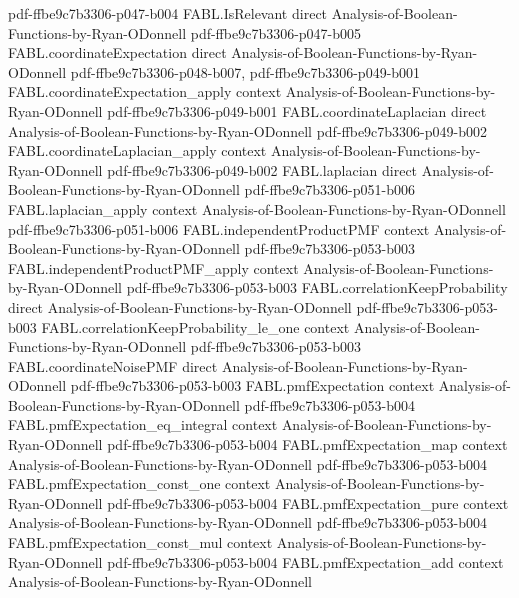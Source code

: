 \begin{theorem}
  {pdf-ffbe9c7b3306-p047-b004}
\proofstep
  {FABL.IsRelevant}
  {direct}
  {Analysis-of-Boolean-Functions-by-Ryan-ODonnell}
  {pdf-ffbe9c7b3306-p047-b005}
\proofstep
  {FABL.coordinateExpectation}
  {direct}
  {Analysis-of-Boolean-Functions-by-Ryan-ODonnell}
  {pdf-ffbe9c7b3306-p048-b007,
    pdf-ffbe9c7b3306-p049-b001}
\proofstep
  {FABL.coordinateExpectation_apply}
  {context}
  {Analysis-of-Boolean-Functions-by-Ryan-ODonnell}
  {pdf-ffbe9c7b3306-p049-b001}
\proofstep
  {FABL.coordinateLaplacian}
  {direct}
  {Analysis-of-Boolean-Functions-by-Ryan-ODonnell}
  {pdf-ffbe9c7b3306-p049-b002}
\proofstep
  {FABL.coordinateLaplacian_apply}
  {context}
  {Analysis-of-Boolean-Functions-by-Ryan-ODonnell}
  {pdf-ffbe9c7b3306-p049-b002}
\proofstep
  {FABL.laplacian}
  {direct}
  {Analysis-of-Boolean-Functions-by-Ryan-ODonnell}
  {pdf-ffbe9c7b3306-p051-b006}
\proofstep
  {FABL.laplacian_apply}
  {context}
  {Analysis-of-Boolean-Functions-by-Ryan-ODonnell}
  {pdf-ffbe9c7b3306-p051-b006}
\proofstep
  {FABL.independentProductPMF}
  {context}
  {Analysis-of-Boolean-Functions-by-Ryan-ODonnell}
  {pdf-ffbe9c7b3306-p053-b003}
\proofstep
  {FABL.independentProductPMF_apply}
  {context}
  {Analysis-of-Boolean-Functions-by-Ryan-ODonnell}
  {pdf-ffbe9c7b3306-p053-b003}
\proofstep
  {FABL.correlationKeepProbability}
  {direct}
  {Analysis-of-Boolean-Functions-by-Ryan-ODonnell}
  {pdf-ffbe9c7b3306-p053-b003}
\proofstep
  {FABL.correlationKeepProbability_le_one}
  {context}
  {Analysis-of-Boolean-Functions-by-Ryan-ODonnell}
  {pdf-ffbe9c7b3306-p053-b003}
\proofstep
  {FABL.coordinateNoisePMF}
  {direct}
  {Analysis-of-Boolean-Functions-by-Ryan-ODonnell}
  {pdf-ffbe9c7b3306-p053-b003}
\proofstep
  {FABL.pmfExpectation}
  {context}
  {Analysis-of-Boolean-Functions-by-Ryan-ODonnell}
  {pdf-ffbe9c7b3306-p053-b004}
\proofstep
  {FABL.pmfExpectation_eq_integral}
  {context}
  {Analysis-of-Boolean-Functions-by-Ryan-ODonnell}
  {pdf-ffbe9c7b3306-p053-b004}
\proofstep
  {FABL.pmfExpectation_map}
  {context}
  {Analysis-of-Boolean-Functions-by-Ryan-ODonnell}
  {pdf-ffbe9c7b3306-p053-b004}
\proofstep
  {FABL.pmfExpectation_const_one}
  {context}
  {Analysis-of-Boolean-Functions-by-Ryan-ODonnell}
  {pdf-ffbe9c7b3306-p053-b004}
\proofstep
  {FABL.pmfExpectation_pure}
  {context}
  {Analysis-of-Boolean-Functions-by-Ryan-ODonnell}
  {pdf-ffbe9c7b3306-p053-b004}
\proofstep
  {FABL.pmfExpectation_const_mul}
  {context}
  {Analysis-of-Boolean-Functions-by-Ryan-ODonnell}
  {pdf-ffbe9c7b3306-p053-b004}
\proofstep
  {FABL.pmfExpectation_add}
  {context}
  {Analysis-of-Boolean-Functions-by-Ryan-ODonnell}

\end{theorem}
